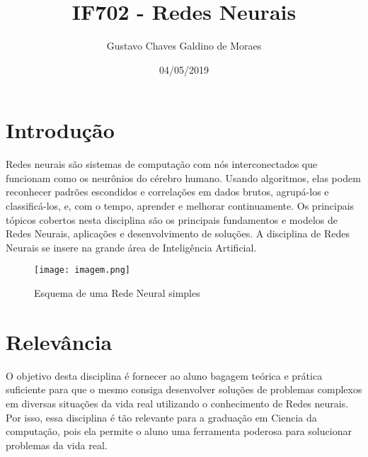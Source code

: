 \documentclass{article}
\title{IF702 - Redes Neurais}
\author{Gustavo Chaves Galdino de Moraes}
\date{04/05/2019}
\begin{document}
\maketitle

\section{Introdução}
Redes neurais são sistemas de computação com nós interconectados que funcionam como os neurônios do cérebro humano. Usando algoritmos, elas podem reconhecer padrões escondidos e correlações em dados brutos, agrupá-los e classificá-los, e, com o tempo, aprender e melhorar continuamente.\citep{site2}
\newline
Os principais tópicos cobertos nesta disciplina são os principais fundamentos e modelos de Redes Neurais, aplicações e desenvolvimento de soluções.\citep{disciplina}
\newline
A disciplina de Redes Neurais se insere na grande área de Inteligência Artificial.
\begin{figure}[h!]
\centering
\texttt{[image: imagem.png]}\citep{wiki:1}
\caption{Esquema de uma Rede Neural simples}
\label{fig:download}
\end{figure}


\section{Relevância}    

O objetivo desta disciplina é fornecer ao aluno bagagem teórica e prática suficiente para que o mesmo consiga desenvolver soluções de problemas complexos em diversas situações da vida real utilizando o conhecimento de Redes neurais.\newline
Por isso, essa disciplina é tão relevante para a graduação em Ciencia da computação, pois ela permite o aluno uma ferramenta poderosa para solucionar problemas da vida real.
\end{document}
